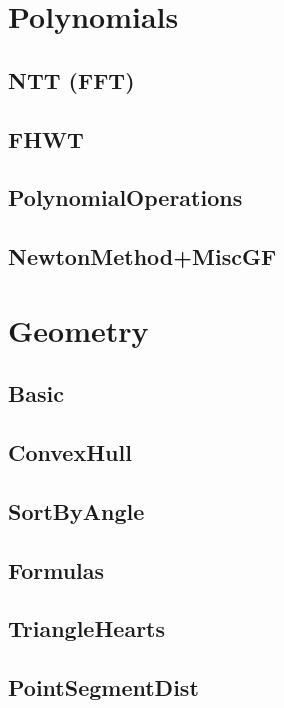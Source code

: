 \section{Polynomials}
\subsection{NTT (FFT)}


\subsection{FHWT}

\subsection{PolynomialOperations}

\subsection{NewtonMethod+MiscGF}

\section{Geometry}
\subsection{Basic}

\subsection{ConvexHull}

\subsection{SortByAngle}

\subsection{Formulas}

\subsection{TriangleHearts}

\subsection{PointSegmentDist}


